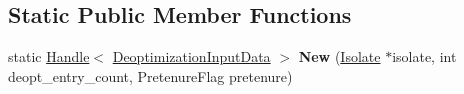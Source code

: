 \subsection*{Static Public Member Functions}
\begin{DoxyCompactItemize}
\item 
static \hyperlink{classv8_1_1internal_1_1_handle}{Handle}$<$ \hyperlink{classv8_1_1internal_1_1_deoptimization_input_data}{Deoptimization\+Input\+Data} $>$ {\bfseries New} (\hyperlink{classv8_1_1internal_1_1_isolate}{Isolate} $\ast$isolate, int deopt\+\_\+entry\+\_\+count, Pretenure\+Flag pretenure)\hypertarget{classv8_1_1internal_1_1_deoptimization_input_data_afbde2ddd3590fcd487dd5034c3c084e2}{}\label{classv8_1_1internal_1_1_deoptimization_input_data_afbde2ddd3590fcd487dd5034c3c084e2}

\end{DoxyCompactItemize}
